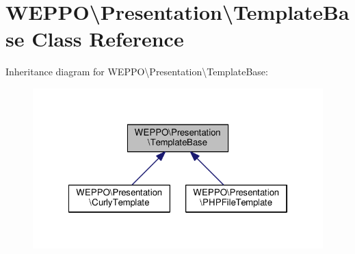 \hypertarget{classWEPPO_1_1Presentation_1_1TemplateBase}{}\section{W\+E\+P\+PO\textbackslash{}Presentation\textbackslash{}Template\+Base Class Reference}
\label{classWEPPO_1_1Presentation_1_1TemplateBase}


Inheritance diagram for W\+E\+P\+PO\textbackslash{}Presentation\textbackslash{}Template\+Base\+:\nopagebreak
\begin{figure}[H]
\begin{center}
\leavevmode
\includegraphics[width=322pt]{classWEPPO_1_1Presentation_1_1TemplateBase__inherit__graph}
\end{center}
\end{figure}
